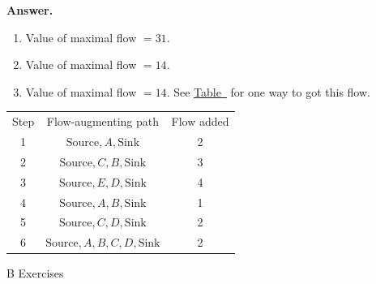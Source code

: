 \documentclass[10pt,]{book}
\theoremstyle{plain}
\theoremstyle{definition}
\theoremstyle{definition}
\theoremstyle{definition}
\theoremstyle{definition}
\theoremstyle{definition}
\numberwithin{equation}{section}
\newcommand{\hrulethick} {\noalign{\hrule height 0.11em}}
\begin{document}
\begin{exercisegroup}
\par\smallskip
\par\smallskip
\noindent\textbf{Answer.}\hypertarget{answer-14}{}\quad
\leavevmode%
\begin{enumerate}[label=\alph*]
\item\hypertarget{li-116}{} Value of maximal flow \(=31\).%
\item\hypertarget{li-117}{} Value of maximal flow \(=14\).%
\item\hypertarget{li-118}{} Value of maximal flow \(=14\). See \hyperref[table-solution-9-5-7]{Table~} for one way to got this flow.%
\end{enumerate}
%
\leavevmode%
\begin{table}
\centering
\begin{tabular}{ccc}\hrulethick
Step&Flow-augmenting path&Flow added\tabularnewline[0pt]
1&\(\text{Source},A,\text{Sink}\)&2\tabularnewline[0pt]
2&\(\text{Source}, C,B, \text{Sink}\)&3\tabularnewline[0pt]
3&\(\text{Source},E,D, \text{Sink}\)&4\tabularnewline[0pt]
4&\(\text{Source},A,B,\text{Sink}\)&1\tabularnewline[0pt]
5&\(\text{Source},C,D, \text{Sink}\)&2\tabularnewline[0pt]
6&\(\text{Source},A,B,C,D, \text{Sink}\)&2
\end{tabular}
\end{table}
\end{exercisegroup}
\par\smallskip\noindent
\hypertarget{exercisegroup-8}{}\typeout{************************************************}
\typeout{************************************************}
B Exercises%
\end{document}
